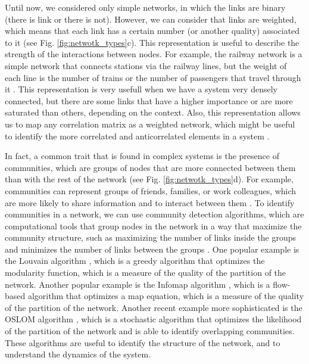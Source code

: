 Until now, we considered only simple networks, in which the links are binary (there is link or there is not). However, we can consider that links are weighted, which means that each link has a certain number (or another quality) associated to it \cite{barrat2004architecture} (see Fig. \ref{fig:netwotk_types}c). This representation is useful to describe the strength of the interactions between nodes. For example, the railway network is a simple network that connects stations via the railway lines, but the weight of each line is the number of trains or the number of passengers that travel through it \cite{latora-2002}. This representation is very usefull when we have a system very densely connected, but there are some links that have a higher importance or are more saturated than others, depending on the context. Also, this representation allows us to map any correlation matrix as a weighted network, which might be useful to identify the more correlated and anticorrelated elements in a system \cite{onnela-2003,tumminello-2005}.

In fact, a common trait that is found in complex systems is the presence of communities, which are groups of nodes that are more connected between them than with the rest of the network \cite{girvan-2002} (see Fig. \ref{fig:netwotk_types}d). For example, communities can represent groups of friends, families, or work colleagues, which are more likely to share information and to interact between them \cite{newman2001structure}. To identify communities in a network, we can use community detection algorithms, which are computational tools that group nodes in the network in a way that maximize the community structure, such as maximizing the number of links inside the groups and minimizes the number of links between the groups \cite{lancichinetti-2008,fortunato2010community}. One popular example is the Louvain algorithm \cite{blondel-2008}, which is a greedy algorithm that optimizes the modularity function, which is a measure of the quality of the partition of the network. Another popular example is the Infomap algorithm \cite{rosvall-2008}, which is a flow-based algorithm that optimizes a map equation, which is a measure of the quality of the partition of the network. Another recent example more sophisticated is the OSLOM algorithm \cite{OSLOM}, which is a stochastic algorithm that optimizes the likelihood of the partition of the network and is able to identify overlapping communities. These algorithms are useful to identify the structure of the network, and to understand the dynamics of the system.

